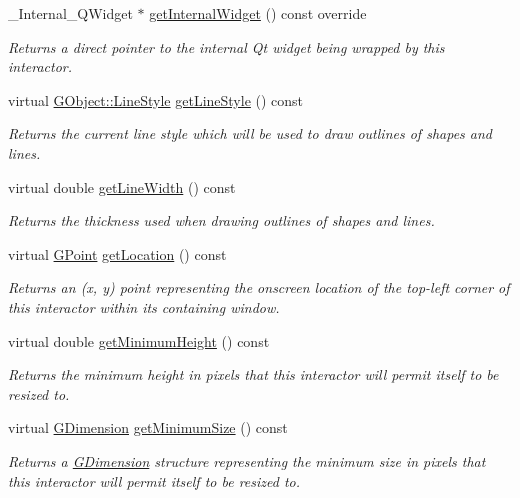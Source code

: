 \begin{DoxyCompactItemize}
\+\_\+\+Internal\+\_\+\+Q\+Widget $\ast$ \mbox{\hyperlink{classsgl_1_1GCanvas_a2f6b36b2517087dc90a366b5ce1f5323}{get\+Internal\+Widget}} () const override
\begin{DoxyCompactList}\small\item\em Returns a direct pointer to the internal Qt widget being wrapped by this interactor. \end{DoxyCompactList}\item 
virtual \mbox{\hyperlink{classsgl_1_1GObject_a86e0f5648542856159bb40775c854aa7}{G\+Object\+::\+Line\+Style}} \mbox{\hyperlink{classsgl_1_1GDrawingSurface_aaf1f5ea8281e5e3486662878d26f0a13}{get\+Line\+Style}} () const
\begin{DoxyCompactList}\small\item\em Returns the current line style which will be used to draw outlines of shapes and lines. \end{DoxyCompactList}\item 
virtual double \mbox{\hyperlink{classsgl_1_1GDrawingSurface_a85ff266dc3eb63d9f2d8e5a4487fd3c0}{get\+Line\+Width}} () const
\begin{DoxyCompactList}\small\item\em Returns the thickness used when drawing outlines of shapes and lines. \end{DoxyCompactList}\item 
virtual \mbox{\hyperlink{structsgl_1_1GPoint}{G\+Point}} \mbox{\hyperlink{classsgl_1_1GInteractor_a4f83802015511edeb63b892830812c11}{get\+Location}} () const
\begin{DoxyCompactList}\small\item\em Returns an (x, y) point representing the onscreen location of the top-\/left corner of this interactor within its containing window. \end{DoxyCompactList}\item 
virtual double \mbox{\hyperlink{classsgl_1_1GInteractor_aed4b0075fcc434499c3cb3e46896bda3}{get\+Minimum\+Height}} () const
\begin{DoxyCompactList}\small\item\em Returns the minimum height in pixels that this interactor will permit itself to be resized to. \end{DoxyCompactList}\item 
virtual \mbox{\hyperlink{structsgl_1_1GDimension}{G\+Dimension}} \mbox{\hyperlink{classsgl_1_1GInteractor_a66b5af0b32493b4d597ca0a3df2049ea}{get\+Minimum\+Size}} () const
\begin{DoxyCompactList}\small\item\em Returns a \mbox{\hyperlink{structsgl_1_1GDimension}{G\+Dimension}} structure representing the minimum size in pixels that this interactor will permit itself to be resized to. \end{DoxyCompactList}\item 

\end{DoxyCompactItemize}
